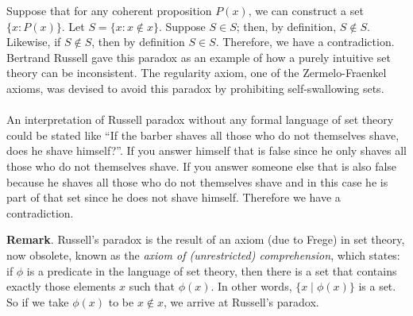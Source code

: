 \documentclass[12pt]{article}
\begin{document}
Suppose that for any coherent proposition $P(x)$, we can construct a set $\{x: P(x)\}$.
\medskip
Let $S = \{x: x \not\in x\}$.  Suppose $S \in S$; then, by definition, $S \not\in S$.  Likewise, if $S \not\in S$, then by definition $S \in S$.  Therefore, we have a contradiction.
\medskip
Bertrand Russell gave this paradox as an example of how a purely intuitive set theory can be inconsistent.  The regularity axiom, one of the Zermelo-Fraenkel axioms, was devised to avoid this paradox by prohibiting self-swallowing sets.\\\\
An interpretation of Russell paradox without any formal language of set theory could be stated like ``If the barber shaves all those who do not themselves shave, does he shave himself?''.  If you answer himself that is false since he only shaves all those who do not themselves shave.  If you answer someone else that is also false because he shaves all those who do not themselves shave and in this case he is part of that set since he does not shave himself.  Therefore we have a contradiction.

\textbf{Remark}.  Russell's paradox is the result of an axiom (due to Frege) in set theory, now obsolete, known as the \emph{axiom of (unrestricted) comprehension}, which states: if $\phi$ is a predicate in the language of set theory, then there is a set that contains exactly those elements $x$ such that $\phi(x)$.  In other words, $\lbrace x\mid \phi(x)\rbrace$ is a set.  So if we take $\phi(x)$ to be $x\notin x$, we arrive at Russell's paradox.
\end{document}
